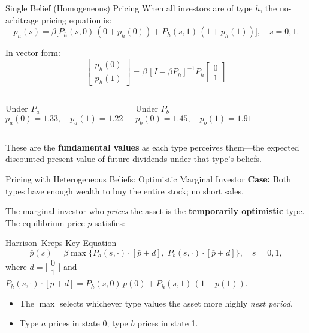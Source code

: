 \documentclass[aspectratio=169]{beamer}
\newcommand{\pbar}{\bar{p}}
\newcommand{\Pa}{P_a}
\newcommand{\Pb}{P_b}
\begin{document}
\begin{frame}{Single Belief (Homogeneous) Pricing}
  When all investors are of type $h$, the no-arbitrage pricing equation is:
  \[
    p_h(s) = \beta \bigl[ P_h(s,0)\,(0 + p_h(0)) + P_h(s,1)\,(1 + p_h(1)) \bigr],
    \quad s=0,1.
  \]

  In vector form:
  \[
    \begin{bmatrix} p_h(0) \\ p_h(1) \end{bmatrix}
    = \beta\,[I - \beta P_h]^{-1} P_h \begin{bmatrix} 0 \\ 1 \end{bmatrix}
  \]

  \medskip
  \begin{columns}
    \begin{block}{Under $\Pa$}
      \[
        p_a(0) = 1.33, \quad p_a(1) = 1.22
      \]
    \end{block}
    \begin{block}{Under $\Pb$}
      \[
        p_b(0) = 1.45, \quad p_b(1) = 1.91
      \]
    \end{block}
  \end{columns}

  \medskip
  These are the \textbf{fundamental values} as each type perceives them---the
  expected discounted present value of future dividends under that type's
  beliefs.
\end{frame}

\begin{frame}{Pricing with Heterogeneous Beliefs: Optimistic Marginal Investor}
  \textbf{Case:} Both types have enough wealth to buy the entire stock; no
  short sales.

  \medskip
  The marginal investor who \emph{prices} the asset is the \textbf{temporarily
  optimistic} type. The equilibrium price $\pbar$ satisfies:

  \begin{alertblock}{Harrison--Kreps Key Equation}
    \[
      \pbar(s) = \beta \max\bigl\{
        P_a(s,\cdot)\cdot[\pbar + d],\;
        P_b(s,\cdot)\cdot[\pbar + d]
      \bigr\}, \quad s=0,1,
    \]
    where $d = \bigl[\begin{smallmatrix}0\\1\end{smallmatrix}\bigr]$
    and $P_h(s,\cdot)\cdot[\pbar+d]
       = P_h(s,0)\,\pbar(0) + P_h(s,1)\,(1+\pbar(1))$.
  \end{alertblock}

  \medskip
  \begin{itemize}
    \item The $\max$ selects whichever type values the asset more highly
          \emph{next period}.
    \item Type $a$ prices in state 0; type $b$ prices in state 1.
  \end{itemize}
\end{frame}
\end{document}
